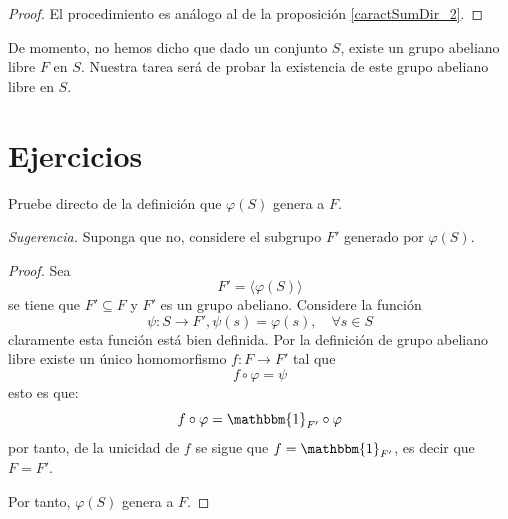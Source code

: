\documentclass[12pt]{report}
\theoremstyle{largebreak}
\newcommand\cf[3]{\ensuremath{#1:#2\rightarrow#3}}
\newcommand{\bbm}[1]{\mathbbm{#1}}
\begin{document}
    \begin{proof}
        El procedimiento es análogo al de la proposición \ref{caractSumDir_2}.
    \end{proof}

    De momento, no hemos dicho que dado un conjunto $S$, existe un grupo abeliano libre $F$ en $S$. Nuestra tarea será de probar la existencia de este grupo abeliano libre en $S$.


    \newpage

    \section{Ejercicios}

    \begin{excer}
        Pruebe directo de la definición que $\varphi(S)$ genera a $F$.

        \textit{Sugerencia.} Suponga que no, considere el subgrupo $F'$ generado por $\varphi(S)$.
    \end{excer}

    \begin{proof}
        Sea
        \begin{equation*}
            F'=\langle\varphi(S)\rangle
        \end{equation*}
        se tiene que $F'\subseteq F$ y $F'$ es un grupo abeliano. Considere la función
        \begin{equation*}
            \cf{\psi}{S}{F'},\psi(s)=\varphi(s),\quad\forall s\in S
        \end{equation*}
        claramente esta función está bien definida. Por la definición de grupo abeliano libre existe un único homomorfismo $\cf{f}{F}{F'}$ tal que
        \begin{equation*}
            f\circ\varphi=\psi
        \end{equation*}
        esto es que:
        \begin{equation*}
            f\circ\varphi=\bbm{1}_{F'}\circ\varphi
        \end{equation*}
        por tanto, de la unicidad de $f$ se sigue que $f=\bbm{1}_{F'}$, es decir que $F=F'$.

        Por tanto, $\varphi(S)$ genera a $F$.
    \end{proof}
\end{document}
